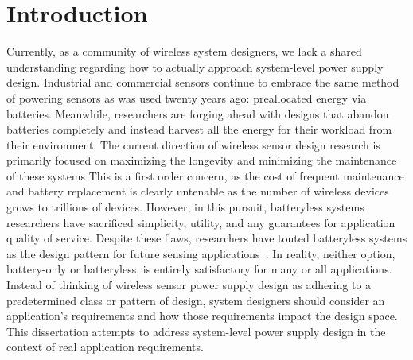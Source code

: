 \chapter{Introduction}
\label{chap:intro}

Currently, as a community of wireless system designers, we lack a shared understanding regarding how to actually approach system-level power supply design. 
Industrial and commercial sensors continue to embrace the same method of powering sensors as was used twenty years ago: preallocated energy via batteries. 
Meanwhile, researchers are forging ahead with designs that abandon batteries completely and instead harvest all the energy for their workload from their environment.  
The current direction of wireless sensor design research is primarily focused on maximizing the longevity and minimizing the maintenance of these systems
This is a first order concern, as the cost of frequent maintenance and battery replacement is clearly untenable as the number of wireless devices grows to trillions of devices.
However, in this pursuit, batteryless systems researchers have sacrificed simplicity, utility, and any guarantees for application quality of service. 
Despite these flaws, researchers have touted batteryless systems as the design pattern for future sensing applications~\cite{hester2017future}. 
In reality, neither option, battery-only or batteryless, is entirely satisfactory for many or all applications. 
Instead of thinking of wireless sensor power supply design as adhering to a predetermined class or pattern of design, system designers should consider an application's requirements and how those requirements impact the design space.
This dissertation attempts to address system-level power supply design in the context of real application requirements.


